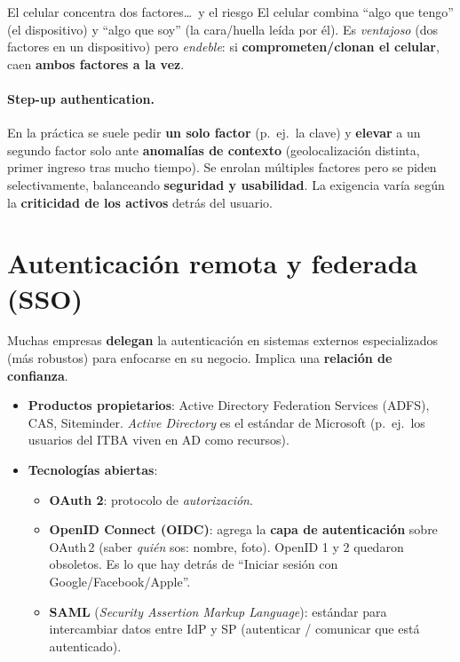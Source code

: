\documentclass[11pt,a4paper]{article}
\begin{document}
\begin{warnbox}{El celular concentra dos factores\dots\ y el riesgo}
El celular combina ``algo que tengo'' (el dispositivo) y ``algo que soy'' (la cara/huella
leída por él). Es \emph{ventajoso} (dos factores en un dispositivo) pero \emph{endeble}: si
\textbf{comprometen/clonan el celular}, caen \textbf{ambos factores a la vez}.
\end{warnbox}

\paragraph{Step-up authentication.} En la práctica se suele pedir \textbf{un solo factor}
(p.\ ej.\ la clave) y \textbf{elevar} a un segundo factor solo ante \textbf{anomalías de
contexto} (geolocalización distinta, primer ingreso tras mucho tiempo). Se enrolan múltiples
factores pero se piden selectivamente, balanceando \textbf{seguridad y usabilidad}. La
exigencia varía según la \textbf{criticidad de los activos} detrás del usuario.

\section{Autenticación remota y federada (SSO)}

Muchas empresas \textbf{delegan} la autenticación en sistemas externos especializados
(más robustos) para enfocarse en su negocio. Implica una \textbf{relación de confianza}.

\begin{itemize}[leftmargin=1.4em,itemsep=2pt]
  \item \textbf{Productos propietarios}: Active Directory Federation Services (ADFS), CAS,
        Siteminder. \emph{Active Directory} es el estándar de Microsoft (p.\ ej.\ los usuarios
        del ITBA viven en AD como recursos).
  \item \textbf{Tecnologías abiertas}:
        \begin{itemize}[leftmargin=1.2em,itemsep=1pt]
          \item \textbf{OAuth 2}: protocolo de \emph{autorización}.
          \item \textbf{OpenID Connect (OIDC)}: agrega la \textbf{capa de autenticación}
                sobre OAuth\,2 (saber \emph{quién} sos: nombre, foto). OpenID 1 y 2 quedaron
                obsoletos. Es lo que hay detrás de ``Iniciar sesión con Google/Facebook/Apple''.
          \item \textbf{SAML} (\emph{Security Assertion Markup Language}): estándar para
                intercambiar datos entre IdP y SP (autenticar / comunicar que está
                autenticado).
        \end{itemize}
\end{itemize}
\end{document}
